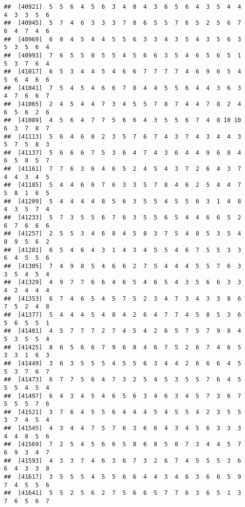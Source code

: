 \documentclass[
]{book}
\begin{document}
\begin{verbatim}
##  [40921]  5  5  6  4  5  6  3  4  8  4  3  6  5  6  4  3  5  4  4  4  3  3  5  6
##  [40945]  5  7  4  6  3  3  3  7  8  6  5  5  7  6  5  2  5  6  7  6  4  7  4  6
##  [40969]  6  8  4  5  4  4  5  5  6  3  3  4  3  5  4  3  5  6  3  5  3  5  6  4
##  [40993]  7  6  5  5  8  5  5  4  5  6  6  3  5  4  6  5  6  5  1  5  3  7  6  4
##  [41017]  6  5  3  4  4  5  4  6  6  7  7  7  7  4  6  9  6  5  4  5  6  4  6  6
##  [41041]  7  5  4  5  4  6  6  7  8  4  4  5  5  6  4  4  3  6  3  4  7  6  6  7
##  [41065]  2  4  5  4  4  7  3  4  5  5  7  8  7  4  4  7  8  2  4  6  5  6  2  6
##  [41089]  4  5  6  4  7  7  5  6  6  4  3  5  5  6  7  4  8 10 10  6  3  7  8  7
##  [41113]  5  6  4  6  8  2  3  5  7  6  7  4  3  7  4  3  4  4  3  5  7  5  8  3
##  [41137]  5  6  6  6  7  5  3  6  4  7  4  3  6  4  4  9  6  8  4  6  5  8  5  7
##  [41161]  7  7  6  3  6  4  6  5  2  4  5  4  3  7  2  6  4  3  7  4  4  3  4  5
##  [41185]  5  4  4  6  6  7  6  3  3  5  7  8  4  6  2  5  4  4  7  5  8  1  6  5
##  [41209]  5  4  4  4  4  8  5  6  3  5  5  4  5  5  6  3  1  4  8  4  3  5  7  4
##  [41233]  5  7  3  5  5  6  7  6  3  5  5  6  5  4  4  6  6  5  2  6  7  6  6  6
##  [41257]  2  5  5  3  4  6  8  4  5  8  3  7  5  4  8  5  3  5  4  8  9  5  6  2
##  [41281]  6  5  4  6  4  3  1  4  3  4  5  5  4  6  7  5  5  3  3  6  4  5  5  6
##  [41305]  7  4  9  8  5  4  6  6  2  7  5  4  4  4  5  5  7  6  3  3  5  4  5  4
##  [41329]  4  9  7  7  6  6  4  6  5  4  6  5  4  3  5  6  6  3  3  4  2  4  4  4
##  [41353]  6  7  4  6  5  4  5  7  5  2  3  4  7  3  4  3  3  8  6  7  5  2  4  8
##  [41377]  5  4  4  4  5  4  8  4  2  6  4  7  7  4  5  8  5  3  6  5  6  5  5  1
##  [41401]  4  5  7  7  7  2  7  4  5  4  2  6  5  7  5  7  9  8  4  5  3  5  5  4
##  [41425]  8  6  5  6  6  7  9  6  8  4  6  7  5  2  6  7  4  6  5  3  3  1  6  3
##  [41449]  3  6  3  5  5  5  4  5  5  6  3  4  4  2  6  6  6  4  5  5  3  7  6  7
##  [41473]  6  7  7  5  6  4  7  3  2  5  4  5  3  5  5  7  6  4  5  5  5  4  5  4
##  [41497]  6  4  3  4  5  4  6  5  6  3  4  6  3  4  5  7  3  6  7  5  5  5  7  6
##  [41521]  3  7  6  4  5  5  6  4  4  4  5  4  5  5  4  2  3  5  5  3  7  4  5  4
##  [41545]  4  3  4  4  7  5  7  6  3  6  6  4  3  4  5  6  3  3  3  4  4  8  5  6
##  [41569]  7  2  5  4  5  6  6  5  8  6  8  5  8  7  3  4  4  5  7  6  9  3  4  7
##  [41593]  4  3  3  7  4  6  3  6  7  3  2  6  7  4  5  5  5  3  6  6  4  3  3  8
##  [41617]  3  5  5  5  4  5  5  6  6  4  4  3  4  6  3  6  6  5  9  7  4  5  5  6
##  [41641]  5  5  2  5  6  2  7  5  6  6  5  7  7  6  3  6  5  1  3  7  6  5  6  7

\end{verbatim}
\end{document}
